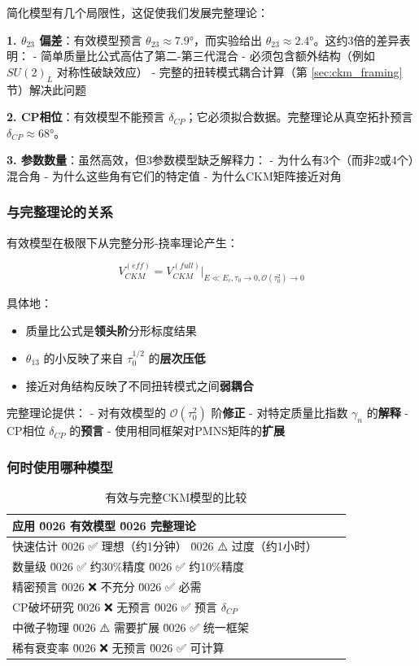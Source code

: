 简化模型有几个局限性，这促使我们发展完整理论：

\textbf{1. $\theta_{23}$ 偏差}：有效模型预言 $\theta_{23} \approx 7.9°$，而实验给出 $\theta_{23} \approx 2.4°$。这约3倍的差异表明：
- 简单质量比公式高估了第二-第三代混合
- 必须包含额外结构（例如 $SU(2)_L$ 对称性破缺效应）
- 完整的扭转模式耦合计算（第 \ref{sec:ckm_framing} 节）解决此问题

\textbf{2. CP相位}：有效模型不能预言 $\delta_{CP}$；它必须拟合数据。完整理论从真空拓扑预言 $\delta_{CP} \approx 68°$。

\textbf{3. 参数数量}：虽然高效，但3参数模型缺乏解释力：
- 为什么有3个（而非2或4个）混合角
- 为什么这些角有它们的特定值
- 为什么CKM矩阵接近对角

\subsubsection{与完整理论的关系}

有效模型在极限下从完整分形-挠率理论产生：

\begin{equation}
    \boxed{V_{CKM}^{(eff)} = V_{CKM}^{(full)}\big|_{E \ll E_c, \tau_0 \to 0, \mathcal{O}(\tau_0^2) \to 0}}
\end{equation}

具体地：

\begin{itemize}
    \item 质量比公式是\textbf{领头阶}分形标度结果
    \item $\theta_{13}$ 的小反映了来自 $\tau_0^{1/2}$ 的\textbf{层次压低}
    \item 接近对角结构反映了不同扭转模式之间\textbf{弱耦合}
\end{itemize}

完整理论提供：
- 对有效模型的 $\mathcal{O}(\tau_0^2)$ 阶\textbf{修正}
- 对特定质量比指数 $\gamma_n$ 的\textbf{解释}
- CP相位 $\delta_{CP}$ 的\textbf{预言}
- 使用相同框架对PMNS矩阵的\textbf{扩展}

\subsubsection{何时使用哪种模型}

\begin{table}[h]
\centering
\begin{tabular}{p{3.5cm}p{4.5cm}p{4.5cm}}
\toprule
\textbf{应用} \u0026 \textbf{有效模型} \u0026 \textbf{完整理论} \\
\midrule
快速估计 \u0026 ✅ 理想（约1分钟） \u0026 ⚠️ 过度（约1小时） \\
数量级 \u0026 ✅ 约30\%精度 \u0026 ✅ 约10\%精度 \\
精密预言 \u0026 ❌ 不充分 \u0026 ✅ 必需 \\
CP破坏研究 \u0026 ❌ 无预言 \u0026 ✅ 预言 $\delta_{CP}$ \\
中微子物理 \u0026 ⚠️ 需要扩展 \u0026 ✅ 统一框架 \\
稀有衰变率 \u0026 ❌ 无预言 \u0026 ✅ 可计算 \\
\bottomrule
\end{tabular}
\caption{有效与完整CKM模型的比较}
\end{table}

